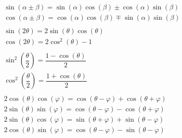 \documentclass[landscape,paperwidth=1920pt, paperheight = 1080pt,fontscale=0.45,columns=3, margin = 0px]{Poster} %
\begin{document}
\begin{poster}
{\begin{align*}
  & \tag{$\angle$ sum/diff}
  \begin{array}{c}
    \sin(\alpha \pm \beta) = \sin(\alpha)\cos(\beta)\pm \cos(\alpha)\sin(\beta)\\
    \cos(\alpha\pm\beta) = \cos(\alpha)\cos(\beta)\mp \sin(\alpha)\sin(\beta)
  \end{array}\\
  & \tag{double $\angle$}
  \begin{array}{c}
    \sin(2\theta) = 2\sin(\theta)\cos(\theta)\\
    \cos(2\theta) = 2\cos^2(\theta)-1
  \end{array}\\
  & \tag{half $\angle$}
  \begin{array}{c}
    \sin^2\left(\dfrac{\theta}{2}\right) = \dfrac{1-\cos(\theta)}{2}\\
    \cos^2\left(\dfrac{\theta}{2}\right) = \dfrac{1+\cos(\theta)}{2}
  \end{array}\\
  & \tag{prod$\rightarrow$sum}
  \begin{array}{c}
    2\cos(\theta)\cos(\varphi) = \cos(\theta -\varphi)+\cos(\theta + \varphi)\\
    2\sin(\theta)\sin(\varphi) = \cos(\theta -\varphi)-\cos(\theta + \varphi)\\
    2\sin(\theta)\cos(\varphi) = \sin(\theta +\varphi)+\sin(\theta - \varphi)\\
    2\cos(\theta)\sin(\varphi) = \cos(\theta -\varphi)-\sin(\theta - \varphi)
  \end{array}
\end{align*}
}

\end{poster}
\end{document}
